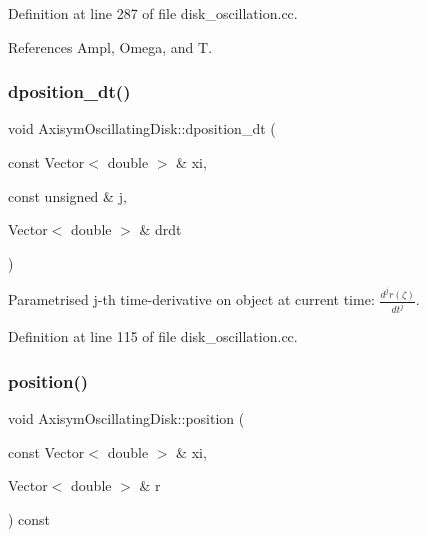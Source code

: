 Definition at line 287 of file disk\+\_\+oscillation.\+cc.



References Ampl, Omega, and T.

\mbox{\label{classAxisymOscillatingDisk_a47de8f45fc7006ccadb1300fefe54dfe}} 
\subsubsection{\texorpdfstring{dposition\+\_\+dt()}{dposition\_dt()}}
{\footnotesize\ttfamily void Axisym\+Oscillating\+Disk\+::dposition\+\_\+dt (\begin{DoxyParamCaption}\item[{const Vector$<$ double $>$ \&}]{xi,  }\item[{const unsigned \&}]{j,  }\item[{Vector$<$ double $>$ \&}]{drdt }\end{DoxyParamCaption})\hspace{0.3cm}{\ttfamily [inline]}}



Parametrised j-\/th time-\/derivative on object at current time\+: $ \frac{d^{j} r(\zeta)}{dt^j} $. 



Definition at line 115 of file disk\+\_\+oscillation.\+cc.

\mbox{\label{classAxisymOscillatingDisk_ab63d762c8fecce8de5a2b7dc4b3b677a}} 
\subsubsection{\texorpdfstring{position()}{position()}}
{\footnotesize\ttfamily void Axisym\+Oscillating\+Disk\+::position (\begin{DoxyParamCaption}\item[{const Vector$<$ double $>$ \&}]{xi,  }\item[{Vector$<$ double $>$ \&}]{r }\end{DoxyParamCaption}) const}



